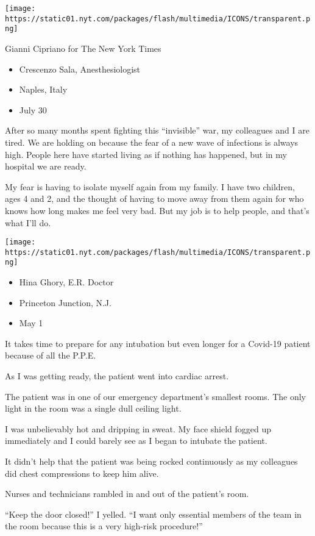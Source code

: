 \texttt{[image: https://static01.nyt.com/packages/flash/multimedia/ICONS/transparent.png]}

Gianni Cipriano for The New York Times

\begin{itemize}
\tightlist
\item
  Crescenzo Sala, Anesthesiologist
\item
  Naples, Italy
\item
  July 30
\end{itemize}

After so many months spent fighting this ``invisible'' war, my
colleagues and I are tired. We are holding on because the fear of a new
wave of infections is always high. People here have started living as if
nothing has happened, but in my hospital we are ready.

My fear is having to isolate myself again from my family. I have two
children, ages 4 and 2, and the thought of having to move away from them
again for who knows how long makes me feel very bad. But my job is to
help people, and that's what I'll do.

\texttt{[image: https://static01.nyt.com/packages/flash/multimedia/ICONS/transparent.png]}

\begin{itemize}
\tightlist
\item
  Hina Ghory, E.R. Doctor
\item
  Princeton Junction, N.J.
\item
  May 1
\end{itemize}

It takes time to prepare for any intubation but even longer for a
Covid-19 patient because of all the P.P.E.

As I was getting ready, the patient went into cardiac arrest.

The patient was in one of our emergency department's smallest rooms. The
only light in the room was a single dull ceiling light.

I was unbelievably hot and dripping in sweat. My face shield fogged up
immediately and I could barely see as I began to intubate the patient.

It didn't help that the patient was being rocked continuously as my
colleagues did chest compressions to keep him alive.

Nurses and technicians rambled in and out of the patient's room.

``Keep the door closed!'' I yelled. ``I want only essential members of
the team in the room because this is a very high-risk procedure!''

